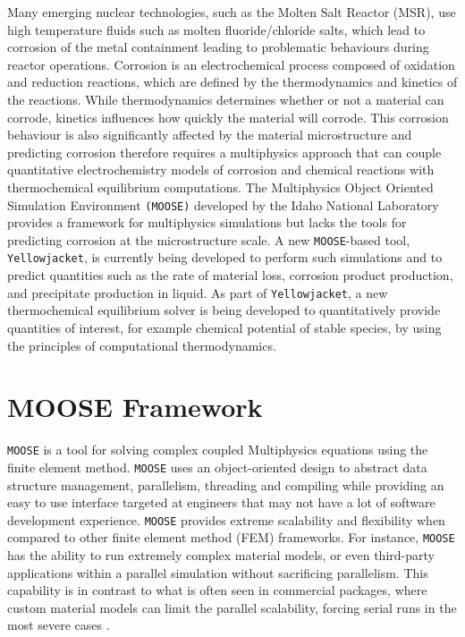Many emerging nuclear technologies, such as the Molten Salt Reactor (MSR), use high temperature fluids such as molten fluoride/chloride salts, which lead to corrosion of the metal containment leading to problematic behaviours during reactor operations. Corrosion is an electrochemical process composed of oxidation and reduction reactions, which are defined by the thermodynamics and kinetics of the reactions. While thermodynamics determines whether or not a material can corrode, kinetics influences how quickly the material will corrode. This corrosion behaviour is also significantly affected by the material microstructure and predicting corrosion therefore requires a multiphysics approach that can couple quantitative electrochemistry models of corrosion and chemical reactions with thermochemical equilibrium computations. The Multiphysics Object Oriented Simulation Environment \texttt{(MOOSE)} developed by the Idaho National Laboratory provides a framework for multiphysics simulations but lacks the tools for predicting corrosion at the microstructure scale. A new \texttt{MOOSE}-based tool, \texttt{Yellowjacket}, is currently being developed to perform such simulations and to predict quantities such as the rate of material loss, corrosion product production, and precipitate production in liquid. As part of \texttt{Yellowjacket}, a new thermochemical equilibrium solver is being developed to quantitatively provide quantities of interest, for example chemical potential of stable species, by using the principles of computational thermodynamics.

\section*{MOOSE Framework}
    \texttt{MOOSE} is a tool for solving complex coupled Multiphysics equations using the finite element method. \texttt{MOOSE} uses an object-oriented design to abstract data structure management, parallelism, threading and compiling while providing an easy to use interface targeted at engineers that may not have a lot of software development experience. \texttt{MOOSE} provides extreme scalability and flexibility when compared to other finite element method (FEM) frameworks. For instance, \texttt{MOOSE} has the ability to run extremely complex material models, or even third-party applications within a parallel simulation without sacrificing parallelism. This capability is in contrast to what is often seen in commercial packages, where custom material models can limit the parallel scalability, forcing serial runs in the most severe cases \cite{gaston2015physics,moose-web-page}.

